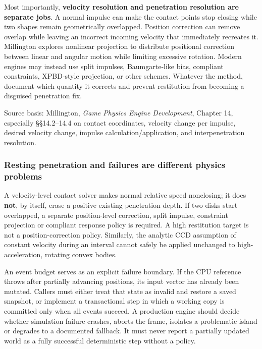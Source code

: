 Most importantly, \textbf{velocity resolution and penetration resolution are separate jobs}. A normal impulse can make the contact points stop closing while two shapes remain geometrically overlapped. Position correction can remove overlap while leaving an incorrect incoming velocity that immediately recreates it. Millington explores nonlinear projection to distribute positional correction between linear and angular motion while limiting excessive rotation. Modern engines may instead use split impulses, Baumgarte-like bias, compliant constraints, XPBD-style projection, or other schemes. Whatever the method, document which quantity it corrects and prevent restitution from becoming a disguised penetration fix.

Source basis: Millington, \emph{Game Physics Engine Development}, Chapter 14, especially §§14.2--14.4 on contact coordinates, velocity change per impulse, desired velocity change, impulse calculation/application, and interpenetration resolution.

\subsubsection{Resting penetration and failures are different physics problems}\label{06-engine-ii-ch046-resting-penetration-and-failures-are-different-physics-problems}

A velocity-level contact solver makes normal relative speed nonclosing; it does \textbf{not}, by itself, erase a positive existing penetration depth. If two disks start overlapped, a separate position-level correction, split impulse, constraint projection or compliant response policy is required. A high restitution target is not a position-correction policy. Similarly, the analytic CCD assumption of constant velocity during an interval cannot safely be applied unchanged to high-acceleration, rotating convex bodies.

An event budget serves as an explicit failure boundary. If the CPU reference throws after partially advancing positions, its input vector has already been mutated. Callers must either treat that state as invalid and restore a saved snapshot, or implement a transactional step in which a working copy is committed only when all events succeed. A production engine should decide whether simulation failure crashes, aborts the frame, isolates a problematic island or degrades to a documented fallback. It must never report a partially updated world as a fully successful deterministic step without a policy.

